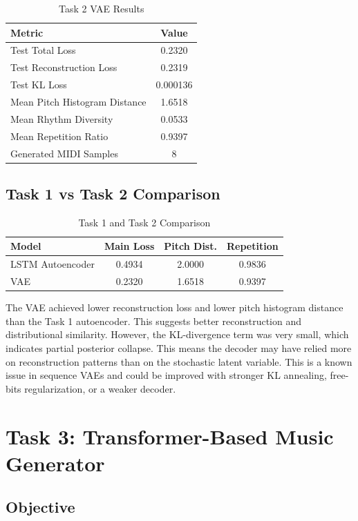 \documentclass[conference]{IEEEtran}
\begin{document}
\begin{table}[h]
\centering
\caption{Task 2 VAE Results}
\begin{tabular}{lc}
\toprule
Metric & Value \\
\midrule
Test Total Loss & 0.2320 \\
Test Reconstruction Loss & 0.2319 \\
Test KL Loss & 0.000136 \\
Mean Pitch Histogram Distance & 1.6518 \\
Mean Rhythm Diversity & 0.0533 \\
Mean Repetition Ratio & 0.9397 \\
Generated MIDI Samples & 8 \\
\bottomrule
\end{tabular}
\end{table}

\subsection{Task 1 vs Task 2 Comparison}

\begin{table}[h]
\centering
\caption{Task 1 and Task 2 Comparison}
\begin{tabular}{lccc}
\toprule
Model & Main Loss & Pitch Dist. & Repetition \\
\midrule
LSTM Autoencoder & 0.4934 & 2.0000 & 0.9836 \\
VAE & 0.2320 & 1.6518 & 0.9397 \\
\bottomrule
\end{tabular}
\end{table}

The VAE achieved lower reconstruction loss and lower pitch histogram distance than the Task 1 autoencoder. This suggests better reconstruction and distributional similarity. However, the KL-divergence term was very small, which indicates partial posterior collapse. This means the decoder may have relied more on reconstruction patterns than on the stochastic latent variable. This is a known issue in sequence VAEs and could be improved with stronger KL annealing, free-bits regularization, or a weaker decoder.

\section{Task 3: Transformer-Based Music Generator}

\subsection{Objective}
\end{document}
